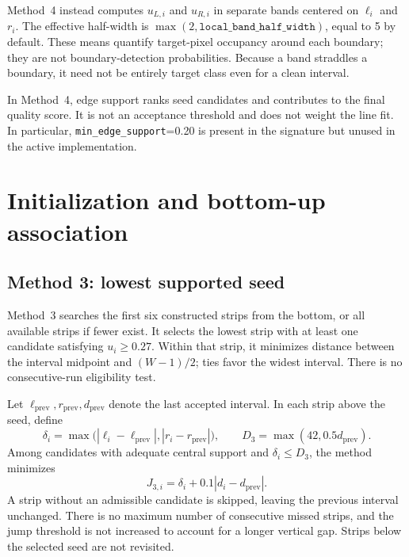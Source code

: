 Method~4 instead computes $u_{L,i}$ and $u_{R,i}$ in separate bands
centered on $\ell_i$ and $r_i$. The effective half-width is
$\max(2,\texttt{local\_band\_half\_width})$, equal to 5 by default.
These means quantify target-pixel occupancy around each boundary; they
are not boundary-detection probabilities. Because a band straddles a
boundary, it need not be entirely target class even for a clean interval.

In Method~4, edge support ranks seed candidates and contributes to the
final quality score. It is not an acceptance threshold and does not
weight the line fit. In particular, \texttt{min\_edge\_support}=0.20
is present in the signature but unused in the active implementation.

\section{Initialization and bottom-up association}
\label{sec:c4_selection}

\subsection{Method 3: lowest supported seed}
\label{subsec:c4_seed3}

Method~3 searches the first six constructed strips from the bottom, or
all available strips if fewer exist. It selects the lowest strip with at
least one candidate satisfying $u_i\geq0.27$. Within that strip, it
minimizes distance between the interval midpoint and $(W-1)/2$; ties
favor the widest interval. There is no consecutive-run eligibility test.

Let $\ell_{\mathrm{prev}},r_{\mathrm{prev}},d_{\mathrm{prev}}$ denote
the last accepted interval. In each strip above the seed, define
\begin{equation}
    \delta_i=\max\bigl(|\ell_i-\ell_{\mathrm{prev}}|,
                            |r_i-r_{\mathrm{prev}}|\bigr),\qquad
    D_3=\max(42,0.5d_{\mathrm{prev}}).
\end{equation}
Among candidates with adequate central support and $\delta_i\leq D_3$,
the method minimizes
\begin{equation}
    J_{3,i}=\delta_i+0.1|d_i-d_{\mathrm{prev}}|.
    \label{eq:c4_cost3}
\end{equation}
A strip without an admissible candidate is skipped, leaving the previous
interval unchanged. There is no maximum number of consecutive missed
strips, and the jump threshold is not increased to account for a longer
vertical gap. Strips below the selected seed are not revisited.

